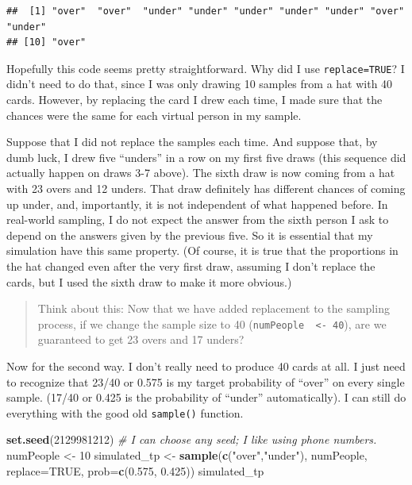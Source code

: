 \documentclass[openany]{book}
\newenvironment{Shaded}{\begin{snugshade}}{\end{snugshade}}
\newcommand{\CommentTok}[1]{\textcolor[rgb]{0.56,0.35,0.01}{\textit{#1}}}
\newcommand{\DataTypeTok}[1]{\textcolor[rgb]{0.13,0.29,0.53}{#1}}
\newcommand{\DecValTok}[1]{\textcolor[rgb]{0.00,0.00,0.81}{#1}}
\newcommand{\FloatTok}[1]{\textcolor[rgb]{0.00,0.00,0.81}{#1}}
\newcommand{\KeywordTok}[1]{\textcolor[rgb]{0.13,0.29,0.53}{\textbf{#1}}}
\newcommand{\NormalTok}[1]{#1}
\newcommand{\OtherTok}[1]{\textcolor[rgb]{0.56,0.35,0.01}{#1}}
\newcommand{\StringTok}[1]{\textcolor[rgb]{0.31,0.60,0.02}{#1}}
\begin{document}
\begin{verbatim}
##  [1] "over"  "over"  "under" "under" "under" "under" "under" "over"  "under"
## [10] "over"
\end{verbatim}

Hopefully this code seems pretty straightforward. Why did I use \texttt{replace=TRUE}? I didn't need to do that, since I was only drawing 10 samples from a hat with 40 cards. However, by replacing the card I drew each time, I made sure that the chances were the same for each virtual person in my sample.

Suppose that I did not replace the samples each time. And suppose that, by dumb luck, I drew five ``unders'' in a row on my first five draws (this sequence did actually happen on draws 3-7 above). The sixth draw is now coming from a hat with 23 overs and 12 unders. That draw definitely has different chances of coming up under, and, importantly, it is not independent of what happened before. In real-world sampling, I do not expect the answer from the sixth person I ask to depend on the answers given by the previous five. So it is essential that my simulation have this same property. (Of course, it is true that the proportions in the hat changed even after the very first draw, assuming I don't replace the cards, but I used the sixth draw to make it more obvious.)

\begin{quote}
Think about this: Now that we have added replacement to the sampling process, if we change the sample size to 40 (\texttt{numPeople\ \ \textless{}-\ 40}), are we guaranteed to get 23 overs and 17 unders?
\end{quote}

Now for the second way. I don't really need to produce 40 cards at all. I just need to recognize that 23/40 or 0.575 is my target probability of ``over'' on every single sample. (17/40 or 0.425 is the probability of ``under'' automatically). I can still do everything with the good old \texttt{sample()} function.

\begin{Shaded}
\begin{Highlighting}[]
\KeywordTok{set.seed}\NormalTok{(}\DecValTok{2129981212}\NormalTok{) }\CommentTok{# I can choose any seed; I like using phone numbers.}
\NormalTok{numPeople <-}\StringTok{ }\DecValTok{10}
\NormalTok{simulated_tp <-}\StringTok{ }\KeywordTok{sample}\NormalTok{(}\KeywordTok{c}\NormalTok{(}\StringTok{"over"}\NormalTok{,}\StringTok{"under"}\NormalTok{), numPeople, }\DataTypeTok{replace=}\OtherTok{TRUE}\NormalTok{, }\DataTypeTok{prob=}\KeywordTok{c}\NormalTok{(}\FloatTok{0.575}\NormalTok{, }\FloatTok{0.425}\NormalTok{))}
\NormalTok{simulated_tp}
\end{Highlighting}
\end{Shaded}
\end{document}
